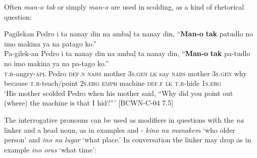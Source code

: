 Often \textit{man-o tak} or simply \textit{man-o} are used in scolding, as a kind of rhetorical question:

\ea
Pagilekan  Pedro  i  ta  nanay  din  na  ambaļ  ta  nanay  din, “\textbf{Man-o}  \textbf{tak}  patudlo  no  imo  makina  ya  na  patago  ko.” \\\smallskip
\gll Pa-gilek-an  Pedro  i  ta  nanay  din  na  ambaļ  ta  nanay  din, “\textbf{Man-o}  \textbf{tak}  pa-tudlo  no  imo  makina  ya  na  pa-tago  ko.” \\
\textsc{t.r}-angry-\textsc{apl}  Pedro  \textsc{def.n}  \textsc{nabs}  mother  3\textsc{s.gen}  \textsc{lk}  say  \textsc{nabs}  mother  3\textsc{s.gen}
why  because  \textsc{t.r}-teach/point  2\textsc{s.erg}  \textsc{emph}  machine  \textsc{def.f}  \textsc{lk}  \textsc{t.r}-hide  1\textsc{s.erg} \\
\glt `His mother scolded Pedro when his mother said, “Why did you point out (where) the machine is that I hid?”' [BCWN-C-04 7.5]
\z

The interrogative pronouns can be used as modifiers in questions with the \textit{na} linker and a head noun, as in examples  and  {}- \textit{kino na manakem} ‘who older person’ and \textit{ino na lugar} ‘what place.’ In conversation the linker may drop as in example  \textit{ino oras} ‘what time’:

